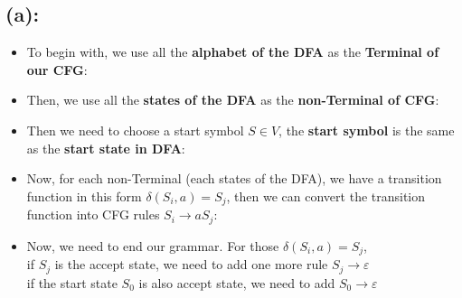 \documentclass [9 pt]{article}
\theoremstyle{definition}
\begin{document}
\subsection*{(a):}
\begin{itemize}
	\item To begin with, we use all the \textbf{alphabet of the DFA} as the \textbf{Terminal of our CFG}:\\
	\item Then, we use all the \textbf{states of the DFA} as the \textbf{non-Terminal of CFG}:\\
	\item Then we need to choose a start symbol $S \in V$, the \textbf{start symbol} is the same as the \textbf{start state in DFA}:\\
	\item Now, for each non-Terminal (each states of the DFA), we have a transition function in this form $\delta(S_i, a) = S_j$, then we can convert the transition function into CFG rules $S_i \to aS_j$:\\
	\item Now, we need to end our grammar. For those $\delta(S_i, a) = S_j$, \\
	if $S_j$ is the accept state, we need to add one more rule $S_j \to \varepsilon$\\
	if the start state $S_0$ is also accept state, we need to add $S_0 \to \varepsilon $
\end{itemize}
\end{document}
